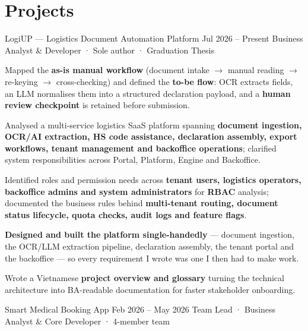 \documentclass[a4paper,9pt]{extarticle}
\begin{document}
\section{Projects}

\cvHeading
  {LogiUP — Logistics Document Automation Platform}
  {Jul 2026 -- Present}
  {Business Analyst \& Developer · Sole author · Graduation Thesis}


\begin{cvBullets}
  \item Mapped the \textbf{as-is manual workflow} (document intake $\rightarrow$ manual reading $\rightarrow$ re-keying $\rightarrow$ cross-checking) and defined the \textbf{to-be flow}: OCR extracts fields, an LLM normalises them into a structured declaration payload, and a \textbf{human review checkpoint} is retained before submission.
  \item Analysed a multi-service logistics SaaS platform spanning \textbf{document ingestion, OCR/AI extraction, HS code assistance, declaration assembly, export workflows, tenant management and backoffice operations}; clarified system responsibilities across Portal, Platform, Engine and Backoffice.
  \item Identified roles and permission needs across \textbf{tenant users, logistics operators, backoffice admins and system administrators} for \textbf{RBAC} analysis; documented the business rules behind \textbf{multi-tenant routing, document status lifecycle, quota checks, audit logs and feature flags}.
  \item \textbf{Designed and built the platform single-handedly} — document ingestion, the OCR/LLM extraction pipeline, declaration assembly, the tenant portal and the backoffice — so every requirement I wrote was one I then had to make work.
  \item Wrote a Vietnamese \textbf{project overview and glossary} turning the technical architecture into BA-readable documentation for faster stakeholder onboarding.
\end{cvBullets}

\vspace{4pt}

\cvHeading
  {Smart Medical Booking App}
  {Feb 2026 -- May 2026}
  {Team Lead · Business Analyst \& Core Developer · 4-member team}
\end{document}
